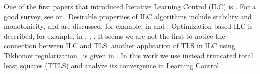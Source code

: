 One of the first papers that introduced Iterative Learning Control (ILC) is \cite{Arimoto84}. For a good survey, see \cite{Bristow06} or \cite{Moore07}. Desirable properties of ILC algorithms include stability and monotonicity, and are discussed, for example, in \cite{Norrloef02} and \cite{Bristow06}. Optimization based ILC is described, for example, in \cite{Amann95}, \cite{Bristow06}, \cite{Moore07}. It seems we are not the first to notice the connection between ILC and TLS: another application of TLS in ILC using Tikhonov regularization~\cite{Golub99} is given in \cite{ZhangBo14}. In this work we use instead truncated total least squares (TTLS) and analyze its convergence in Learning Control. %

